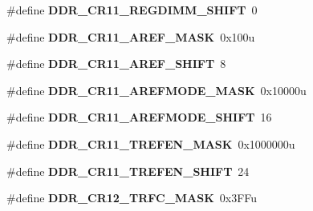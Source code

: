 \begin{DoxyCompactItemize}
\item 
\hypertarget{group___d_d_r___register___masks_ga1b4e2aa30b372093c4bd7f683f4dd9b9}{}\#define {\bfseries D\+D\+R\+\_\+\+C\+R11\+\_\+\+R\+E\+G\+D\+I\+M\+M\+\_\+\+S\+H\+I\+F\+T}~0\label{group___d_d_r___register___masks_ga1b4e2aa30b372093c4bd7f683f4dd9b9}

\item 
\hypertarget{group___d_d_r___register___masks_ga83f1cc10e14a0499afc3d3ce68bf8ae1}{}\#define {\bfseries D\+D\+R\+\_\+\+C\+R11\+\_\+\+A\+R\+E\+F\+\_\+\+M\+A\+S\+K}~0x100u\label{group___d_d_r___register___masks_ga83f1cc10e14a0499afc3d3ce68bf8ae1}

\item 
\hypertarget{group___d_d_r___register___masks_ga259349755173a8cca2e32006d9554ba2}{}\#define {\bfseries D\+D\+R\+\_\+\+C\+R11\+\_\+\+A\+R\+E\+F\+\_\+\+S\+H\+I\+F\+T}~8\label{group___d_d_r___register___masks_ga259349755173a8cca2e32006d9554ba2}

\item 
\hypertarget{group___d_d_r___register___masks_ga3d3d9c301afd116e251ea3e98a26c045}{}\#define {\bfseries D\+D\+R\+\_\+\+C\+R11\+\_\+\+A\+R\+E\+F\+M\+O\+D\+E\+\_\+\+M\+A\+S\+K}~0x10000u\label{group___d_d_r___register___masks_ga3d3d9c301afd116e251ea3e98a26c045}

\item 
\hypertarget{group___d_d_r___register___masks_gaac51c84eee11d66db65f08849d21caab}{}\#define {\bfseries D\+D\+R\+\_\+\+C\+R11\+\_\+\+A\+R\+E\+F\+M\+O\+D\+E\+\_\+\+S\+H\+I\+F\+T}~16\label{group___d_d_r___register___masks_gaac51c84eee11d66db65f08849d21caab}

\item 
\hypertarget{group___d_d_r___register___masks_gaf9d6254a6ae1f80fea6b56bb7eafec22}{}\#define {\bfseries D\+D\+R\+\_\+\+C\+R11\+\_\+\+T\+R\+E\+F\+E\+N\+\_\+\+M\+A\+S\+K}~0x1000000u\label{group___d_d_r___register___masks_gaf9d6254a6ae1f80fea6b56bb7eafec22}

\item 
\hypertarget{group___d_d_r___register___masks_gaf924526245ce6a4c587c16907685b72a}{}\#define {\bfseries D\+D\+R\+\_\+\+C\+R11\+\_\+\+T\+R\+E\+F\+E\+N\+\_\+\+S\+H\+I\+F\+T}~24\label{group___d_d_r___register___masks_gaf924526245ce6a4c587c16907685b72a}

\item 
\hypertarget{group___d_d_r___register___masks_ga9339b962153bc45804a3d9b756339614}{}\#define {\bfseries D\+D\+R\+\_\+\+C\+R12\+\_\+\+T\+R\+F\+C\+\_\+\+M\+A\+S\+K}~0x3\+F\+Fu\label{group___d_d_r___register___masks_ga9339b962153bc45804a3d9b756339614}


\end{DoxyCompactItemize}
